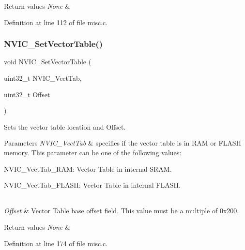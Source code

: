 \begin{DoxyRetVals}{Return values}
{\em None} & \\
\hline
\end{DoxyRetVals}


Definition at line 112 of file misc.\+c.

\mbox{\label{group___m_i_s_c_ga1145208ad70edfc2fab19b8b8ef1b1a1}} 
\subsubsection{\texorpdfstring{N\+V\+I\+C\+\_\+\+Set\+Vector\+Table()}{NVIC\_SetVectorTable()}}
{\footnotesize\ttfamily void N\+V\+I\+C\+\_\+\+Set\+Vector\+Table (\begin{DoxyParamCaption}\item[{uint32\+\_\+t}]{N\+V\+I\+C\+\_\+\+Vect\+Tab,  }\item[{uint32\+\_\+t}]{Offset }\end{DoxyParamCaption})}



Sets the vector table location and Offset. 


\begin{DoxyParams}{Parameters}
{\em N\+V\+I\+C\+\_\+\+Vect\+Tab} & specifies if the vector table is in R\+AM or F\+L\+A\+SH memory. This parameter can be one of the following values\+: \begin{DoxyItemize}
\item N\+V\+I\+C\+\_\+\+Vect\+Tab\+\_\+\+R\+AM\+: Vector Table in internal S\+R\+AM. \item N\+V\+I\+C\+\_\+\+Vect\+Tab\+\_\+\+F\+L\+A\+SH\+: Vector Table in internal F\+L\+A\+SH. \end{DoxyItemize}
\\
\hline
{\em Offset} & Vector Table base offset field. This value must be a multiple of 0x200. \\
\hline
\end{DoxyParams}

\begin{DoxyRetVals}{Return values}
{\em None} & \\
\hline
\end{DoxyRetVals}


Definition at line 174 of file misc.\+c.

